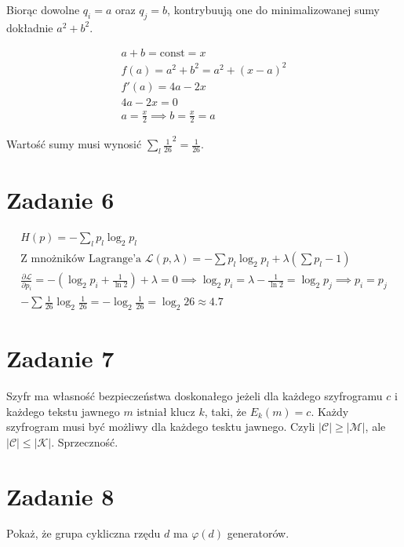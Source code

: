 \documentclass[11pt]{article}
\begin{document}
Biorąc dowolne $q_i = a$ oraz $q_j = b$, kontrybuują one do minimalizowanej sumy dokładnie $a^2+b^2$.

\begin{align*}
a+b = \text{const} = x\\
f(a) = a^2 + b ^ 2 = a^2 + (x-a)^2\\
f'(a) = 4a - 2x\\
4a - 2x = 0\\
a = \frac{x}{2} \implies b = \frac{x}{2} = a
\end{align*}

Wartość sumy musi wynosić $\sum_{l} \frac{1}{26}^2 = \frac{1}{26}$.

\section*{Zadanie 6}
\begin{align*}
H(p) = -\sum_l p_l \log_2{p_l}\\
\text{Z mnożników Lagrange'a } \mathcal{L}(p, \lambda)=-\sum p_l\log_2{p_l}+\lambda(\sum p_l - 1)\\
\frac{\partial \mathcal{L}}{\partial p_i} = -(\log_2 p_i + \frac{1}{\ln 2}) + \lambda = 0 \implies 
\log_2 p_i = \lambda - \frac{1}{\ln 2} = \log_2 p_j \implies p_i = p_j\\
-\sum \frac{1}{26} \log_2 \frac{1}{26} = -\log_2 \frac{1}{26} = \log_2 26 \approx 4.7
\end{align*}

\section*{Zadanie 7}
Szyfr ma własność bezpieczeństwa doskonałego jeżeli dla każdego szyfrogramu $c$ i każdego tekstu jawnego $m$ istniał klucz $k$,
taki, że $E_k(m)=c$. Każdy szyfrogram musi być możliwy dla każdego tesktu jawnego. Czyli $|\mathcal{C}| \geq |\mathcal{M}|$, ale 
$|\mathcal{C}| \leq |\mathcal{K}|$. Sprzeczność.

\section*{Zadanie 8}
Pokaż, że grupa cykliczna rzędu $d$ ma $\varphi(d)$ generatorów.
\end{document}
